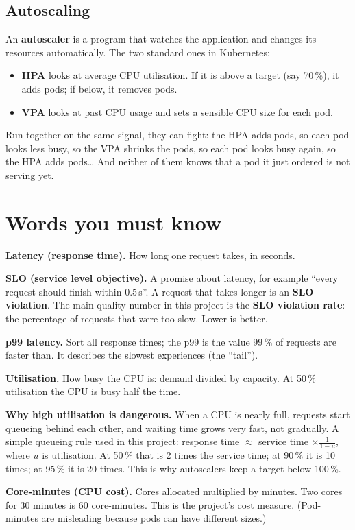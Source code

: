 \documentclass[11pt,a4paper]{article}
\begin{document}
\subsection{Autoscaling}
An \textbf{autoscaler} is a program that watches the application and changes its
resources automatically. The two standard ones in Kubernetes:
\begin{itemize}
\item \textbf{HPA} looks at average CPU utilisation. If it is above a target (say 70\,\%),
it adds pods; if below, it removes pods.
\item \textbf{VPA} looks at past CPU usage and sets a sensible CPU size for each pod.
\end{itemize}
Run together on the same signal, they can fight: the HPA adds pods, so each pod looks less
busy, so the VPA shrinks the pods, so each pod looks busy again, so the HPA adds pods\dots
And neither of them knows that a pod it just ordered is not serving yet.

\section{Words you must know}

\textbf{Latency (response time).} How long one request takes, in seconds.

\textbf{SLO (service level objective).} A promise about latency, for example ``every
request should finish within 0.5\,s''. A request that takes longer is an \textbf{SLO
violation}. The main quality number in this project is the \textbf{SLO violation rate}:
the percentage of requests that were too slow. Lower is better.

\textbf{p99 latency.} Sort all response times; the p99 is the value 99\,\% of requests
are faster than. It describes the slowest experiences (the ``tail'').

\textbf{Utilisation.} How busy the CPU is: demand divided by capacity. At 50\,\%
utilisation the CPU is busy half the time.

\textbf{Why high utilisation is dangerous.} When a CPU is nearly full, requests start
queueing behind each other, and waiting time grows very fast, not gradually. A simple
queueing rule used in this project: response time $\approx$ service time $\times
\frac{1}{1-u}$, where $u$ is utilisation. At 50\,\% that is 2 times the service time; at
90\,\% it is 10 times; at 95\,\% it is 20 times. This is why autoscalers keep a target
below 100\,\%.

\textbf{Core-minutes (CPU cost).} Cores allocated multiplied by minutes. Two cores for 30
minutes is 60 core-minutes. This is the project's cost measure. (Pod-minutes are
misleading because pods can have different sizes.)
\end{document}
